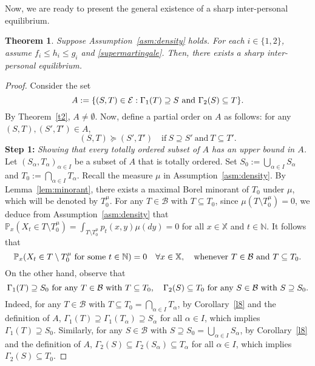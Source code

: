 \documentclass[11pt,reqno]{article}
\numberwithin{equation}{section}
\newtheorem{theorem}{Theorem}[section]
\newtheorem{definition}{Definition}[section]
\newcommand{\thmref}{Theorem~\ref}
\renewcommand{\P}{\mathbb{P}}
\newcommand{\R}{\mathbb{R}}
\newcommand{\cE}{\mathcal{E}}
\newcommand{\N}{\mathbb{N}}
\newcommand{\X}{\mathbb{X}}
\newcommand{\B}{\mathcal{B}}
\begin{document}

Now, we are ready to present the general existence of a sharp inter-personal equilibrium. 

\begin{theorem}\label{t3}
Suppose Assumption~\ref{asm:density} holds. For each $i\in\{1,2\}$, assume $f_i\le h_i\le g_i$ and \eqref{supermartingale}. %
Then, there exists a sharp inter-personal equilibrium.
\end{theorem}

\begin{proof}
Consider the set
$$A:=\{(S,T)\in\cE : \Gamma_1(T)\supseteq S\ \hbox{and}\ \Gamma_2(S)\subseteq T\}.$$
By \thmref{t2}, $A\neq\emptyset$. Now, define a partial order on $A$ as follows: for any $(S,T), (S',T')\in A$, 
\begin{equation}\label{p order}
(S,T)\succeq (S',T')\quad \text{if}\ S\supseteq S'\ \text{and}\ T\subseteq T'.
\end{equation}
{\bf Step 1:} {\it Showing that every totally ordered subset of $A$ has an upper bound in $A$.}\\
Let $(S_\alpha,T_\alpha)_{\alpha\in I}$ be a subset of $A$ that is totally ordered. Set $S_0:=\bigcup_{\alpha\in I} S_{\alpha}$ and $T_0:=\bigcap_{\alpha\in I} T_{\alpha}$. 
Recall the measure $\mu$ in Assumption~\ref{asm:density}. By Lemma~\ref{lem:minorant}, there exists a maximal Borel minorant of $T_0$ under $\mu$, which will be denoted by $T_0^\mu$. %
For any $T\in\B$ with $T\subseteq T_0$, since $\mu(T\setminus T_0^{\mu})=0$, we deduce from Assumption~\ref{asm:density} that $\P_x(X_t\in T\setminus T_0^{\mu}) = \int_{T\setminus T_0^{\mu}} p_t(x,y) \mu(dy)=0$ for all $x\in\X$ and $t\in\N$. It follows that 
\begin{equation}\label{polar}
\P_x(X_t\in T\setminus T_0^{\mu}\ \hbox{for some $t\in\N$}) =0\quad \forall x\in\X,\quad \hbox{whenever $T\in\B$ and $T\subseteq T_0$}. %
\end{equation}
On the other hand, observe that 
\begin{equation}\label{sub, sup}
\Gamma_1(T)\supseteq S_0\ \hbox{for any $T\in\B$ with $T\subseteq T_0$},\quad \Gamma_2(S)\subseteq T_0\ \hbox{for any $S\in\B$ with $S\supseteq S_0$}.
\end{equation}
Indeed, for any $T\in\B$ with $T\subseteq T_0=\bigcap_{\alpha\in I} T_\alpha$, by Corollary~\ref{l8} and the definition of $A$, $\Gamma_1(T)\supseteq \Gamma_1(T_\alpha)\supseteq S_\alpha$ for all $\alpha\in I$, which implies $\Gamma_1(T)\supseteq S_0$. Similarly, for any $S\in\B$ with $S\supseteq S_0=\bigcup_{\alpha\in I} S_\alpha$, by Corollary~\ref{l8} and the definition of $A$, $\Gamma_2(S)\subseteq \Gamma_2(S_\alpha)\subseteq T_\alpha$ for all $\alpha\in I$, which implies $\Gamma_2(S)\subseteq T_0$.   


\end{proof}
\end{document}
